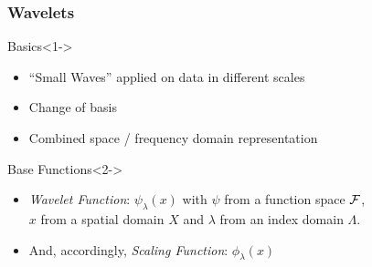 \documentclass{beamer}
\begin{document}
\begin{frame}
  \frametitle{Wavelets}

  \begin{block}{Basics}<1->
    \begin{itemize}
    \item ``Small Waves'' applied on data in different scales
    \item Change of basis
    \item Combined space / frequency domain representation
    \end{itemize}
  \end{block}

  \begin{block}{Base Functions}<2->
    \begin{itemize}
    \item \emph{Wavelet Function}: $\psi_\lambda (x)$ with $\psi$ from a function
      space $\cal F$,\\
      $x$ from a spatial domain $X$ and $\lambda$ from an index domain $\Lambda$.
    \item And, accordingly, \emph{Scaling Function}:  $\phi_\lambda (x)$  
    \end{itemize}
  \end{block}
\end{frame}
\end{document}
